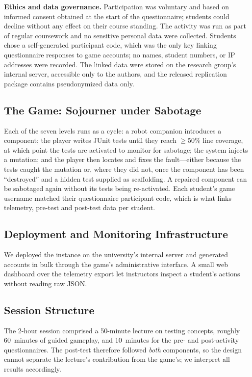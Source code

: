 \documentclass[conference]{IEEEtran}
\begin{document}
\textbf{Ethics and data governance.}
Participation was voluntary and based on informed consent obtained at the start of the questionnaire; students could decline without any effect on their course standing. The activity was run as part of regular coursework and no sensitive personal data were collected.
Students chose a self-generated participant code, which was the only key linking questionnaire responses to game accounts; no names, student numbers, or IP addresses were recorded.
The linked data were stored on the research group's internal server, accessible only to the authors, and the released replication package contains pseudonymized data only.

\subsection{The Game: Sojourner under Sabotage}

Each of the seven levels runs as a cycle: a robot companion introduces a component; the player writes JUnit tests until they reach $\geq$50\% line coverage, at which point the tests are activated to monitor for sabotage; the system injects a mutation; and the player then locates and fixes the fault---either because the tests caught the mutation or, where they did not, once the component has been ``destroyed'' and a hidden test supplied as scaffolding. A repaired component can be sabotaged again without its tests being re-activated.
Each student's game username matched their questionnaire participant code, which is what links telemetry, pre-test and post-test data per student.

\subsection{Deployment and Monitoring Infrastructure}

We deployed the instance on the university's internal server and generated accounts in bulk through the game's administrative interface. A small web dashboard over the telemetry export let instructors inspect a student's actions without reading raw JSON.

\subsection{Session Structure}
The 2-hour session comprised a 50-minute lecture on testing concepts, roughly 60~minutes of guided gameplay, and 10~minutes for the pre- and post-activity questionnaires. The post-test therefore followed \emph{both} components, so the design cannot separate the lecture's contribution from the game's; we interpret all results accordingly.
\end{document}
